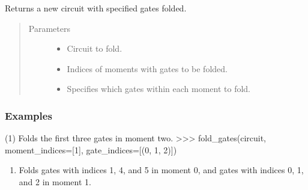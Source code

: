 \documentclass[letterpaper,10pt,english]{sphinxmanual}
\begin{document}
\begin{fulllineitems}
\label{\detokenize{index:mitiq.folding_cirq.fold_gates}}
Returns a new circuit with specified gates folded.
\begin{quote}\begin{description}
\item[{Parameters}] \leavevmode\begin{itemize}
\item {} 
 \sphinxhyphen{}\sphinxhyphen{} Circuit to fold.

\item {} 
 \sphinxhyphen{}\sphinxhyphen{} Indices of moments with gates to be folded.

\item {} 
 \sphinxhyphen{}\sphinxhyphen{} Specifies which gates within each moment to fold.

\end{itemize}

\end{description}\end{quote}
\subsubsection*{Examples}

(1) Folds the first three gates in moment two.
\textgreater{}\textgreater{}\textgreater{} fold\_gates(circuit, moment\_indices={[}1{]}, gate\_indices={[}(0, 1, 2){]})
\begin{enumerate}
%
\setcounter{enumi}{1}
\item {} 
Folds gates with indices 1, 4, and 5 in moment 0,
and gates with indices 0, 1, and 2 in moment 1.

\end{enumerate}

\begin{sphinxVerbatim}[commandchars=\\\{\}]
 \PYG{p}{[} \PYG{p}{]} \PYG{p}{[}     \PYG{p}{]}
\end{sphinxVerbatim}

\end{fulllineitems}
\end{document}
